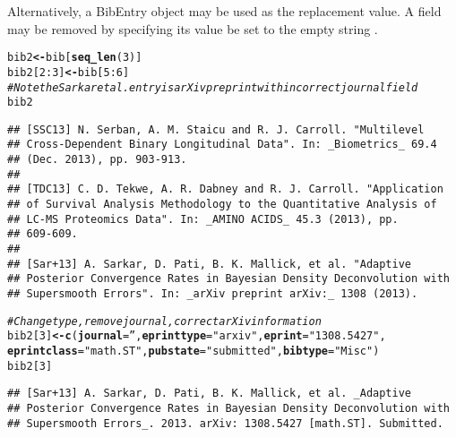 \documentclass[article]{jss}\usepackage[]{graphicx}\usepackage[]{color}
\makeatletter
\newcommand{\hlnum}[1]{\textcolor[rgb]{0.125,0.125,1}{#1}}%
\newcommand{\hlstr}[1]{\textcolor[rgb]{0.125,0.125,1}{#1}}%
\newcommand{\hlcom}[1]{\textcolor[rgb]{1,0,0.753}{\textit{#1}}}%
\newcommand{\hlopt}[1]{\textcolor[rgb]{0.251,0.251,0.282}{#1}}%
\newcommand{\hlstd}[1]{\textcolor[rgb]{0.251,0.251,0.282}{#1}}%
\newcommand{\hlkwb}[1]{\textcolor[rgb]{0.439,0.251,1}{\textbf{#1}}}%
\newcommand{\hlkwc}[1]{\textcolor[rgb]{0.529,0,0.184}{\textbf{#1}}}%
\newcommand{\hlkwd}[1]{\textcolor[rgb]{0.251,0.251,0.282}{\textbf{#1}}}%
\newenvironment{kframe}{%
 \def\at@end@of@kframe{}%
 \ifinner\ifhmode%
  \def\at@end@of@kframe{\end{minipage}}%
  \begin{minipage}{\columnwidth}%
 \fi\fi%
 \def\FrameCommand##1{\hskip\@totalleftmargin \hskip-\fboxsep
 \colorbox{shadecolor}{##1}\hskip-\fboxsep
     \hskip-\linewidth \hskip-\@totalleftmargin \hskip\columnwidth}%
 \MakeFramed {\advance\hsize-\width
   \@totalleftmargin\z@ \linewidth\hsize
   \@setminipage}}%
 {\par\unskip\endMakeFramed%
 \at@end@of@kframe}
\newenvironment{knitrout}{}{} %
\makeatother
\begin{document}
Alternatively, a BibEntry object may be used as the replacement value.  A field may be removed by specifying its value be
set to the empty string .
\begin{knitrout}
\color{fgcolor}\begin{kframe}
\begin{alltt}
\hlstd{bib2} \hlkwb{<-} \hlstd{bib[}\hlkwd{seq_len}\hlstd{(}\hlnum{3}\hlstd{)]}
\hlstd{bib2[}\hlnum{2}\hlopt{:}\hlnum{3}\hlstd{]} \hlkwb{<-} \hlstd{bib[}\hlnum{5}\hlopt{:}\hlnum{6}\hlstd{]}
\hlcom{# Note the Sarkar et al. entry is arXiv preprint with incorrect journal field}
\hlstd{bib2}
\end{alltt}
\begin{verbatim}
## [SSC13] N. Serban, A. M. Staicu and R. J. Carroll. "Multilevel
## Cross-Dependent Binary Longitudinal Data". In: _Biometrics_ 69.4
## (Dec. 2013), pp. 903-913.
## 
## [TDC13] C. D. Tekwe, A. R. Dabney and R. J. Carroll. "Application
## of Survival Analysis Methodology to the Quantitative Analysis of
## LC-MS Proteomics Data". In: _AMINO ACIDS_ 45.3 (2013), pp.
## 609-609.
## 
## [Sar+13] A. Sarkar, D. Pati, B. K. Mallick, et al. "Adaptive
## Posterior Convergence Rates in Bayesian Density Deconvolution with
## Supersmooth Errors". In: _arXiv preprint arXiv:_ 1308 (2013).
\end{verbatim}
\begin{alltt}
\hlcom{# Change type, remove journal, correct arXiv information}
\hlstd{bib2[}\hlnum{3}\hlstd{]} \hlkwb{<-} \hlkwd{c}\hlstd{(}\hlkwc{journal}\hlstd{=}\hlstr{''}\hlstd{,} \hlkwc{eprinttype} \hlstd{=} \hlstr{"arxiv"}\hlstd{,} \hlkwc{eprint} \hlstd{=} \hlstr{"1308.5427"}\hlstd{,}
           \hlkwc{eprintclass} \hlstd{=} \hlstr{"math.ST"}\hlstd{,} \hlkwc{pubstate} \hlstd{=} \hlstr{"submitted"}\hlstd{,} \hlkwc{bibtype} \hlstd{=} \hlstr{"Misc"}\hlstd{)}
\hlstd{bib2[}\hlnum{3}\hlstd{]}
\end{alltt}
\begin{verbatim}
## [Sar+13] A. Sarkar, D. Pati, B. K. Mallick, et al. _Adaptive
## Posterior Convergence Rates in Bayesian Density Deconvolution with
## Supersmooth Errors_. 2013. arXiv: 1308.5427 [math.ST]. Submitted.
\end{verbatim}
\end{kframe}
\end{knitrout}
\end{document}
